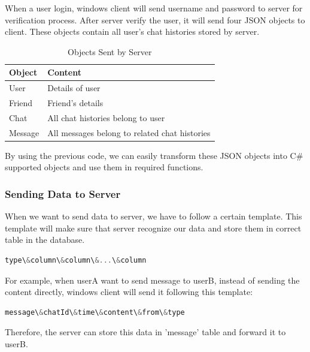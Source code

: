\documentclass[a4paper,11pt]{article}
\begin{document}
When a user login, windows client will send username and password to server for verification process. After server verify the user, it will send four JSON objects to client. These objects contain all user's chat histories stored by server.

\begin{table}
\centering
\begin{tabular}{l|l}
\hline
Object & Content  \\\hline
User & Details of user  \\\hline
Friend & Friend's details  \\\hline
Chat & All chat histories belong to user  \\\hline
Message & All messages belong to related chat histories  \\\hline
\end{tabular}
\caption{\label{tab:json}Objects Sent by Server}
\end{table}

By using the previous code, we can easily transform these JSON objects into C\# supported objects and use them in required functions. 

\subsubsection{Sending Data to Server}

When we want to send data to server, we have to follow a certain template. This template will make sure that server recognize our data and store them in correct table in the database. 

\begin{lstlisting}[language=C]
type\&column\&column\&...\&column
\end{lstlisting}

For example, when userA want to send message to userB, instead of sending the content directly, windows client will send it following this template:

\begin{lstlisting}[language=C]
message\&chatId\&time\&content\&from\&type
\end{lstlisting}

Therefore, the server can store this data in 'message' table and forward it to userB.
\end{document}
